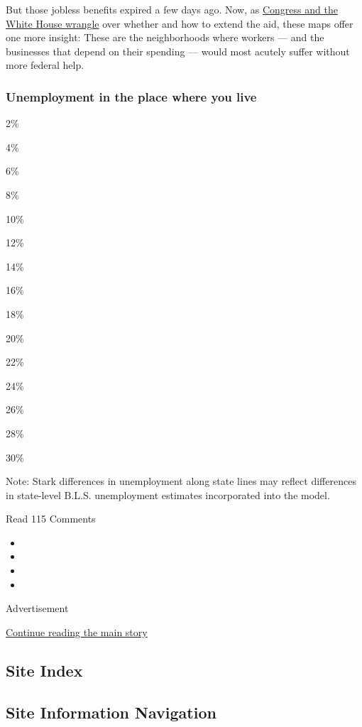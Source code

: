 But those jobless benefits expired a few days ago. Now, as
\href{https://www.nytimes.com/2020/08/03/us/politics/congress-jobless-aid-talks-trump.html}{Congress
and the White House wrangle} over whether and how to extend the aid,
these maps offer one more insight: These are the neighborhoods where
workers --- and the businesses that depend on their spending --- would
most acutely suffer without more federal help.

\hypertarget{unemployment-in-the-place-where-you-live}{%
\subsubsection{Unemployment in the place where you
live}\label{unemployment-in-the-place-where-you-live}}

2\%

4\%

6\%

8\%

10\%

12\%

14\%

16\%

18\%

20\%

22\%

24\%

26\%

28\%

30\%

Note: Stark differences in unemployment along state lines may reflect
differences in state-level B.L.S. unemployment estimates incorporated
into the model.

Read 115 Comments

\begin{itemize}
\item
\item
\item
\item
\end{itemize}

Advertisement

\protect\hyperlink{after-bottom}{Continue reading the main story}

\hypertarget{site-index}{%
\subsection{Site Index}\label{site-index}}

\hypertarget{site-information-navigation}{%
\subsection{Site Information
Navigation}\label{site-information-navigation}}


